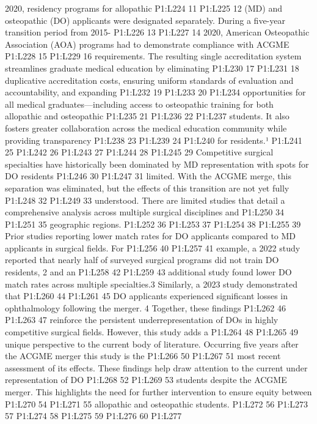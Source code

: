 2020, residency programs for allopathic P1:L224 11 P1:L225 12 (MD) and
osteopathic (DO) applicants were designated separately. During a
five-year transition period from 2015- P1:L226 13 P1:L227 14 2020,
American Osteopathic Association (AOA) programs had to demonstrate
compliance with ACGME P1:L228 15 P1:L229 16 requirements. The resulting
single accreditation system streamlines graduate medical education by
eliminating P1:L230 17 P1:L231 18 duplicative accreditation costs,
ensuring uniform standards of evaluation and accountability, and
expanding P1:L232 19 P1:L233 20 P1:L234 opportunities for all medical
graduates---including access to osteopathic training for both allopathic
and osteopathic P1:L235 21 P1:L236 22 P1:L237 students. It also fosters
greater collaboration across the medical education community while
providing transparency P1:L238 23 P1:L239 24 P1:L240 for residents.¹
P1:L241 25 P1:L242 26 P1:L243 27 P1:L244 28 P1:L245 29 Competitive
surgical specialties have historically been dominated by MD
representation with spots for DO residents P1:L246 30 P1:L247 31
limited. With the ACGME merge, this separation was eliminated, but the
effects of this transition are not yet fully P1:L248 32 P1:L249 33
understood. There are limited studies that detail a comprehensive
analysis across multiple surgical disciplines and P1:L250 34 P1:L251 35
geographic regions. P1:L252 36 P1:L253 37 P1:L254 38 P1:L255 39 Prior
studies reporting lower match rates for DO applicants compared to MD
applicants in surgical fields. For P1:L256 40 P1:L257 41 example, a 2022
study reported that nearly half of surveyed surgical programs did not
train DO residents, 2 and an P1:L258 42 P1:L259 43 additional study
found lower DO match rates across multiple specialties.3 Similarly, a
2023 study demonstrated that P1:L260 44 P1:L261 45 DO applicants
experienced significant losses in ophthalmology following the merger. 4
Together, these findings P1:L262 46 P1:L263 47 reinforce the persistent
underrepresentation of DOs in highly competitive surgical fields.
However, this study adds a P1:L264 48 P1:L265 49 unique perspective to
the current body of literature. Occurring five years after the ACGME
merger this study is the P1:L266 50 P1:L267 51 most recent assessment of
its effects. These findings help draw attention to the current under
representation of DO P1:L268 52 P1:L269 53 students despite the ACGME
merger. This highlights the need for further intervention to ensure
equity between P1:L270 54 P1:L271 55 allopathic and osteopathic
students. P1:L272 56 P1:L273 57 P1:L274 58 P1:L275 59 P1:L276 60 P1:L277
